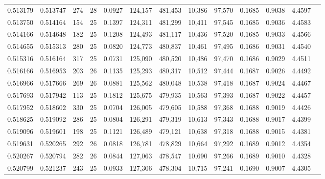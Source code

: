 \begin{tabular}{rrrrrrrrrrrrr}
0.513179 & 0.513747 &   274 &  28 &                                     0.0927 & 124,157 & 481,453 &  10,386 &  97,570 & 0.1685 & 0.9038 & 4.4597 \\
0.513750 & 0.514164 &   154 &  25 &                                     0.1397 & 124,311 & 481,299 &  10,411 &  97,545 & 0.1685 & 0.9036 & 4.4583 \\
0.514166 & 0.514648 &   182 &  25 &                                     0.1208 & 124,493 & 481,117 &  10,436 &  97,520 & 0.1685 & 0.9033 & 4.4566 \\
0.514655 & 0.515313 &   280 &  25 &                                     0.0820 & 124,773 & 480,837 &  10,461 &  97,495 & 0.1686 & 0.9031 & 4.4540 \\
0.515316 & 0.516164 &   317 &  25 &                                     0.0731 & 125,090 & 480,520 &  10,486 &  97,470 & 0.1686 & 0.9029 & 4.4511 \\
0.516166 & 0.516953 &   203 &  26 &                                     0.1135 & 125,293 & 480,317 &  10,512 &  97,444 & 0.1687 & 0.9026 & 4.4492 \\
0.516966 & 0.517666 &   269 &  26 &                                     0.0881 & 125,562 & 480,048 &  10,538 &  97,418 & 0.1687 & 0.9024 & 4.4467 \\
0.517693 & 0.517942 &   113 &  25 &                                     0.1812 & 125,675 & 479,935 &  10,563 &  97,393 & 0.1687 & 0.9022 & 4.4457 \\
0.517952 & 0.518602 &   330 &  25 &                                     0.0704 & 126,005 & 479,605 &  10,588 &  97,368 & 0.1688 & 0.9019 & 4.4426 \\
0.518625 & 0.519092 &   286 &  25 &                                     0.0804 & 126,291 & 479,319 &  10,613 &  97,343 & 0.1688 & 0.9017 & 4.4399 \\
0.519096 & 0.519601 &   198 &  25 &                                     0.1121 & 126,489 & 479,121 &  10,638 &  97,318 & 0.1688 & 0.9015 & 4.4381 \\
0.519631 & 0.520265 &   292 &  26 &                                     0.0818 & 126,781 & 478,829 &  10,664 &  97,292 & 0.1689 & 0.9012 & 4.4354 \\
0.520267 & 0.520794 &   282 &  26 &                                     0.0844 & 127,063 & 478,547 &  10,690 &  97,266 & 0.1689 & 0.9010 & 4.4328 \\
0.520799 & 0.521237 &   243 &  25 &                                     0.0933 & 127,306 & 478,304 &  10,715 &  97,241 & 0.1690 & 0.9007 & 4.4305 \\

\end{tabular}
